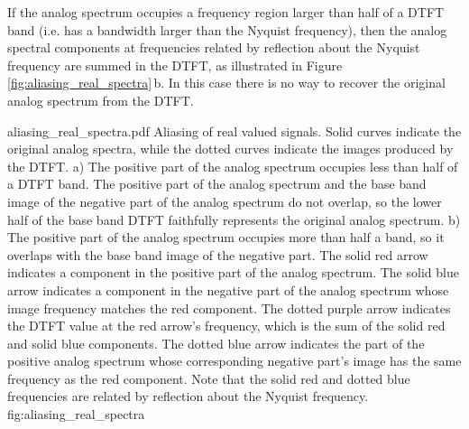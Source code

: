 \documentclass[twocolumn]{article}
\begin{document}
If the analog spectrum occupies a frequency region larger than half of a DTFT band (i.e. has a bandwidth larger than the Nyquist frequency), then the analog spectral components at frequencies related by reflection about the Nyquist frequency are summed in the DTFT, as illustrated in Figure \ref{fig:aliasing_real_spectra}\,b.
In this case there is no way to recover the original analog spectrum from the DTFT.

{aliasing_real_spectra.pdf}
{Aliasing of real valued signals.
Solid curves indicate the original analog spectra, while the dotted curves indicate the images produced by the DTFT.
a) The positive part of the analog spectrum occupies less than half of a DTFT band.
The positive part of the analog spectrum and the base band image of the negative part of the analog spectrum do not overlap, so the lower half of the base band DTFT faithfully represents the original analog spectrum.
b) The positive part of the analog spectrum occupies more than half a band, so it overlaps with the base band image of the negative part.
The solid red arrow indicates a component in the positive part of the analog spectrum.
The solid blue arrow indicates a component in the negative part of the analog spectrum whose image frequency matches the red component.
The dotted purple arrow indicates the DTFT value at the red arrow's frequency, which is the sum of the solid red and solid blue components.
The dotted blue arrow indicates the part of the positive analog spectrum whose corresponding negative part's image has the same frequency as the red component.
Note that the solid red and dotted blue frequencies are related by reflection about the Nyquist frequency.
}
{fig:aliasing_real_spectra}
\end{document}
